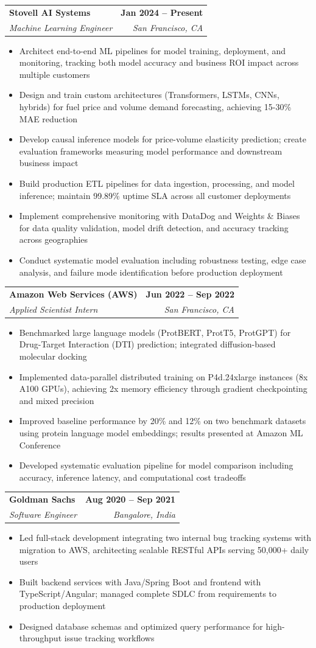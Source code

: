 \documentclass[letterpaper,11pt]{article}
\makeatletter
\newcommand{\resumeItem}[1]{
  \item\small{
    {#1 \vspace{-2pt}}
  }
}
\newcommand{\resumeSubheading}[4]{
  \vspace{-2pt}\item
    \begin{tabular*}{1.0\textwidth}[t]{l@{\extracolsep{\fill}}r}
      \textbf{#1} & \textbf{\small #2} \\
      \textit{\small#3} & \textit{\small #4} \\
    \end{tabular*}\vspace{-7pt}
}
\newcommand{\resumeItemListStart}{\begin{itemize}}
\newcommand{\resumeItemListEnd}{\end{itemize}\vspace{-5pt}}
\makeatother
\begin{document}
    \resumeSubheading
      {Stovell AI Systems}{Jan 2024 -- Present}
      {Machine Learning Engineer}{San Francisco, CA}
      \resumeItemListStart
        \resumeItem{Architect end-to-end ML pipelines for model training, deployment, and monitoring, tracking both model accuracy and business ROI impact across multiple customers}
        \resumeItem{Design and train custom architectures (Transformers, LSTMs, CNNs, hybrids) for fuel price and volume demand forecasting, achieving 15-30\% MAE reduction}
        \resumeItem{Develop causal inference models for price-volume elasticity prediction; create evaluation frameworks measuring model performance and downstream business impact}
        \resumeItem{Build production ETL pipelines for data ingestion, processing, and model inference; maintain 99.89\% uptime SLA across all customer deployments}
        \resumeItem{Implement comprehensive monitoring with DataDog and Weights \& Biases for data quality validation, model drift detection, and accuracy tracking across geographies}
        \resumeItem{Conduct systematic model evaluation including robustness testing, edge case analysis, and failure mode identification before production deployment}
      \resumeItemListEnd

    \resumeSubheading
      {Amazon Web Services (AWS)}{Jun 2022 -- Sep 2022}
      {Applied Scientist Intern}{San Francisco, CA}
      \resumeItemListStart
        \resumeItem{Benchmarked large language models (ProtBERT, ProtT5, ProtGPT) for Drug-Target Interaction (DTI) prediction; integrated diffusion-based molecular docking}
        \resumeItem{Implemented data-parallel distributed training on P4d.24xlarge instances (8x A100 GPUs), achieving 2x memory efficiency through gradient checkpointing and mixed precision}
        \resumeItem{Improved baseline performance by 20\% and 12\% on two benchmark datasets using protein language model embeddings; results presented at Amazon ML Conference}
        \resumeItem{Developed systematic evaluation pipeline for model comparison including accuracy, inference latency, and computational cost tradeoffs}
    \resumeItemListEnd

    \resumeSubheading
      {Goldman Sachs}{Aug 2020 -- Sep 2021}
      {Software Engineer}{Bangalore, India}
      \resumeItemListStart
        \resumeItem{Led full-stack development integrating two internal bug tracking systems with migration to AWS, architecting scalable RESTful APIs serving 50,000+ daily users}
        \resumeItem{Built backend services with Java/Spring Boot and frontend with TypeScript/Angular; managed complete SDLC from requirements to production deployment}
        \resumeItem{Designed database schemas and optimized query performance for high-throughput issue tracking workflows}
      \resumeItemListEnd
\end{document}
